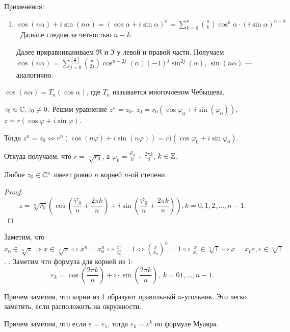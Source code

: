 \slashn
Применения:
\begin{enumerate}
    \item $\cos(n\alpha) + i\sin(n\alpha) = (\cos \alpha + i \sin \alpha)^n = \sum_{k=0}^n \binom{n}{k} \cos^k \alpha \cdot (i\sin\alpha)^{n-k}$. Дальше следим за четностью  $n-k$. 

        Далее приравниваниваем  $\Re$ и  $\Im$  у левой и правой части. Получаем  $\cos(n\alpha)$ = $\sum_{j=0}^{\left[\frac{n}{2}\right]} \binom{n}{2j} \cos^{n-2j}(\alpha)(-1)^j\sin^{2j}(\alpha)$, $\sin(n\alpha)$ --- аналогично. 

\end{enumerate}
\begin{definition}
    $\cos(n\alpha) = T_n(\cos \alpha)$, где $T_n$ называется многочленом Чебышева.
\end{definition}
$z_0 \in \mathbb{C}, z_0 \neq 0$. Решим уравнение  $z^n=z_0$.  $z_0 = r_0(\cos \varphi_0 + i \sin(\varphi_0))$, $z = r(\cos \varphi + i \sin \varphi)$.

Тогда  $z^n = z_0 \iff r^n(\cos(n \varphi) + i\sin(n \varphi)) = r)(\cos \varphi_0 + i \sin \varphi_0)$.

Откуда получаем, что  $r = \sqrt[n]{r_0}$, а  $\varphi_k = \frac{\varphi_0}{n} + \frac{2\pi k}{n}$, $k \in \mathbb{Z}$. 
 \begin{theorem}
     Любое $z_0 \in \mathbb{C}^*$ имеет ровно  $n$ корней $n$-ой степени.  
\end{theorem}
\begin{proof}
     \[
         z = \sqrt[n]{r_0}(\cos(\frac{\varphi_0}{n} + \frac{2\pi k}{n}) + i \sin (\frac{\varphi_0}{n}  + \frac{2\pi k}{n})), k = 0,1,2,\ldots,n-1
     .\] 
\end{proof}
\slashn
Заметим, что $x_0 \in \sqrt[n]{z} \Rightarrow x \in \sqrt[n]{z} \iff x^n = x_0^n \iff \frac{x^n}{x_0^n} = 1 \iff \left(\frac{x}{x_0}\right)^n = 1 \iff \frac{x}{x_0} \in \sqrt[n]{1} \iff x = x_0 \varepsilon, \varepsilon \in \sqrt[n]{1}$.
.
Заметим что формула для корней из 1: \[
    \varepsilon_k = \cos\left(\frac{2\pi k}{n}\right) + i \cdot \sin\left(\frac{2\pi k}{n}\right),\ k=01,\ldots,n-1
.\] 

Причем заметим, что корни из 1 образуют правильный $n$-угольник. Это легко заметить, если расположить на окружности.

Причем заметим, что если $\varepsilon = \varepsilon_1$, тогда $\varepsilon_k = \varepsilon^k$ по формуле Муавра.

